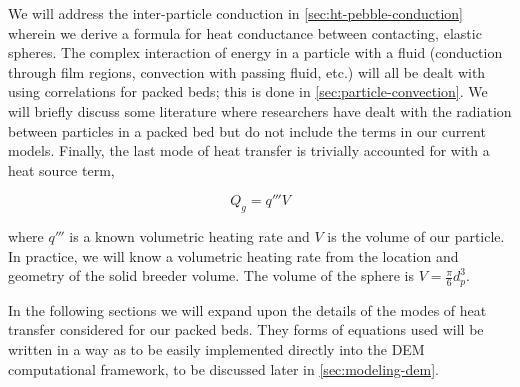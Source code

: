 We will address the inter-particle conduction in \cref{sec:ht-pebble-conduction} wherein we derive a formula for heat conductance between contacting, elastic spheres. The complex interaction of energy in a particle with a fluid (conduction through film regions, convection with passing fluid, etc.) will all be dealt with using correlations for packed beds; this is done in \cref{sec:particle-convection}. We will briefly discuss some literature where researchers have dealt with the radiation between particles in a packed bed but do not include the terms in our current models. Finally, the last mode of heat transfer is trivially accounted for with a heat source term,

\begin{equation}\label{eq:nuclear-heating-term}
	Q_g = q'''V
\end{equation}

where $q'''$ is a known volumetric heating rate and $V$ is the volume of our particle. In practice, we will know a volumetric heating rate from the location and geometry of the solid breeder volume. The volume of the sphere is $V = \frac{\pi}{6} d_p^3$.

In the following sections we will expand upon the details of the modes of heat transfer considered for our packed beds. They forms of equations used will be written in a way as to be easily implemented directly into the DEM computational framework, to be discussed later in \cref{sec:modeling-dem}.








